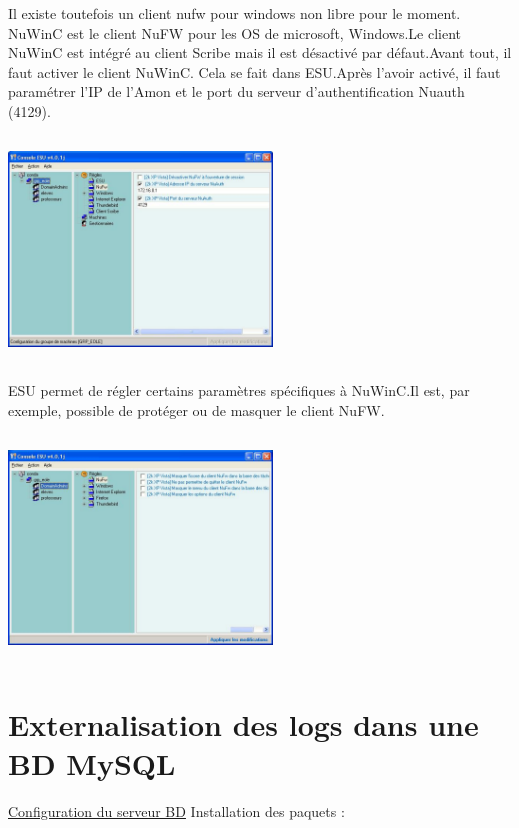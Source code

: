\documentclass[12pt]{report}
\begin{document}
\begin{itemize}
\vspace{0,7cm}
Il existe toutefois un client nufw pour windows non libre pour le moment. NuWinC est le client NuFW pour les OS de microsoft, Windows.Le client NuWinC est intégré au client Scribe mais il est désactivé par défaut.Avant tout, il faut activer le client NuWinC. Cela se fait dans ESU.Après l'avoir activé, il faut paramétrer l'IP de l'Amon et le port du serveur d'authentification Nuauth (4129).
\begin{center}
  \includegraphics[width=7cm,height=6cm]{images/nuwinc.png}
\end{center}
\newpage
ESU permet de régler certains paramètres spécifiques à NuWinC.Il est, par exemple, possible de protéger ou de masquer le client NuFW.
\begin{center}
  \includegraphics[width=7cm,height=6cm]{images/nuwinc1.png}
\end{center}
\chapter{Externalisation des logs dans une BD MySQL}
\underline{Configuration du serveur BD}
\newline
Installation des paquets :
\newline


\end{itemize}
\end{document}
